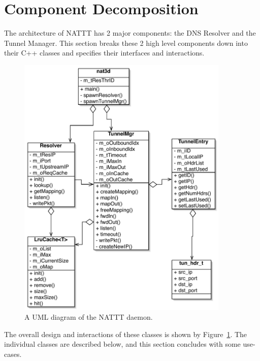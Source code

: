 \section{Component Decomposition}\label{sec:comp}

The architecture of NATTT has 2 major components: the DNS Resolver and the Tunnel Manager.  This section breaks these 2 high level components 
down into their C++ classes and specifies their interfaces and interactions.

\begin{figure}
\begin{center}
\includegraphics[width=0.9\textwidth]{figs/uml}
\end{center}
\caption{A UML diagram of the NATTT daemon.}
\label{fig:uml}
\end{figure}

The overall design and interactions of these classes is shown by Figure~\ref{fig:uml}.  The individual classes are described below, and
this section concludes with some use-cases.


